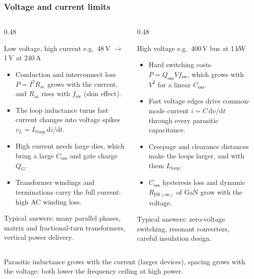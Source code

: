 \begin{frame}
	\frametitle{Voltage and current limits}
	\begin{columns}[T]
		\begin{column}{0.48\textwidth}
			\begin{block}{Low voltage, high current}
				\footnotesize
				e.g.\ 48\,V $\rightarrow$ 1\,V at 240\,A
				\begin{itemize}
					\item Conduction and interconnect loss $P=I^2R_\mathrm{ac}$ grows with the current, and $R_\mathrm{ac}$ rises with $f_\mathrm{sw}$ (skin effect).
					\item The loop inductance turns fast current changes into voltage spikes $v_L=L_\mathrm{loop}\,\mathrm{d}i/\mathrm{d}t$.
					\item High current needs large dies, which bring a large $C_\mathrm{oss}$ and gate charge $Q_\mathrm{G}$.
					\item Transformer windings and terminations carry the full current: high AC winding loss.
				\end{itemize}
				Typical answers: many parallel phases, matrix and fractional-turn transformers, vertical power delivery.
			\end{block}
		\end{column}
		\begin{column}{0.48\textwidth}
			\begin{block}{High voltage}
				\footnotesize
				e.g.\ 400\,V bus at 1\,kW
				\begin{itemize}
					\item Hard switching costs $P=Q_\mathrm{oss}V f_\mathrm{sw}$, which grows with $V^2$ for a linear $C_\mathrm{oss}$.
					\item Fast voltage edges drive common-mode current $i=C\,\mathrm{d}v/\mathrm{d}t$ through every parasitic capacitance.
					\item Creepage and clearance distances make the loops larger, and with them $L_\mathrm{loop}$.
					\item $C_\mathrm{oss}$ hysteresis loss and dynamic $R_\mathrm{DS(on)}$ of GaN grow with the voltage.
				\end{itemize}
				Typical answers: zero-voltage switching, resonant converters, careful insulation design.
			\end{block}
		\end{column}
	\end{columns}
	\vspace{0.1cm}
	{\small Parasitic inductance grows with the current (larger devices), spacing grows with the voltage: both lower the frequency ceiling at high power.}
\end{frame}

